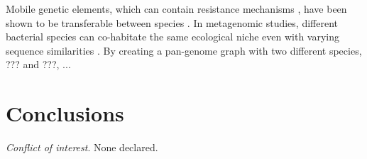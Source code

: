 \documentclass{article}
\begin{document}
Mobile genetic elements, which can contain resistance mechanisms \cite{harbottle2006genetics}, have been shown to be transferable between species \cite{frost2005mobile}.
In metagenomic studies, different bacterial species can co-habitate the same ecological niche even with varying sequence similarities \cite{konstantinidis2006bacterial}.
By creating a pan-genome graph with two different species, ??? and ???, ...

\section{Conclusions}


\textit{Conflict of interest}. None declared.

\newpage



\end{document}
